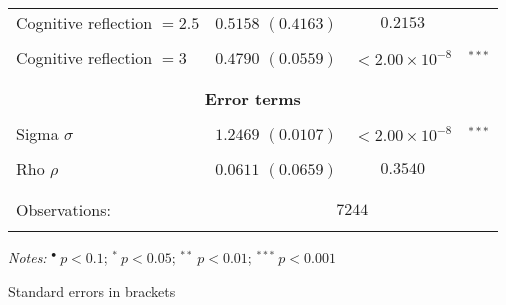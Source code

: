 \documentclass[a4paper,12pt]{article}
\begin{document}
{\begin{threeparttable}
\begin{small}
\begin{tabular}{lrcl}
  \\
\vspace{-0.2cm}Cognitive reflection $=2.5$&$0.5158$ $(0.4163)$&$0.2153$&\\
  \\
  \vspace{-0.2cm}Cognitive reflection $=3$&$0.4790$ $(0.0559)$&$<2.00\times 10^{-8}$&$^{***}$\\
  \\
 \hline
  \vspace{-0.25cm} \\
  \multicolumn{4}{c}{\vspace{0.1cm}\textbf{Error terms}}\\
   \hline
      \\
      \vspace{-0.2cm}Sigma $\sigma$&$1.2469$ $(0.0107)$&$<2.00\times 10^{-8}$&$^{***}$\\
  \\
\vspace{-0.2cm}Rho $\rho$&$0.0611$ $(0.0659)$&$0.3540$&\\
\\
\hline
\vspace{-0.4cm} \\ Observations:&    \multicolumn{3}{c}{$7244$} \\  \vspace{-0.4cm}
\\
\hline
\end{tabular} 
\end{small}
 \begin{tablenotes}
  \begin{footnotesize}
   \item \textit{Notes:} \hspace{0.2cm}$^{\bullet}~p<0.1$; $^{*}~p<0.05$; $^{**}~p<0.01$; $^{***}~p<0.001$
\item[]   \begin{adjustwidth}{1cm}{}Standard errors in brackets
     \end{adjustwidth}
  \end{footnotesize}
\end{tablenotes}
  \end{threeparttable} 
\par}
\linespread{1}
\vspace{1cm}
\end{document}
